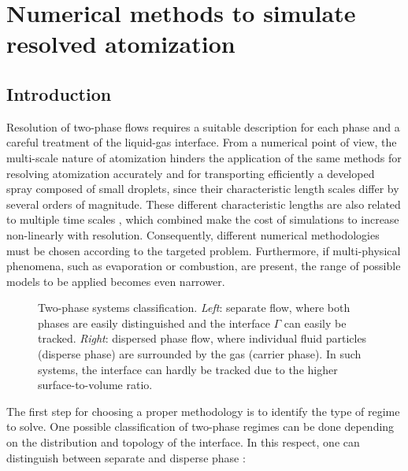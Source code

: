 \chapter{Numerical methods to simulate resolved atomization}
	\label{ch2:numerical_methods_resolved_atomization}

\section{Introduction}


Resolution of two-phase flows requires a suitable description for each phase and a careful treatment of the liquid-gas interface. From a numerical point of view, the multi-scale nature of atomization hinders the application of the same methods for resolving atomization accurately and for transporting efficiently a developed spray composed of small droplets, since their characteristic length scales differ by several orders of magnitude. These different characteristic lengths are also related to multiple time scales , which combined make the cost of simulations to increase non-linearly with resolution. Consequently, different numerical methodologies must be chosen according to the targeted problem. Furthermore, if multi-physical phenomena, such as evaporation or combustion, are present, the range of possible models to be applied becomes even narrower.

\begin{figure}[h!]	
	\centering
{}
	\caption[Two-phase systems classification]{Two-phase systems classification. \textsl{Left}: separate flow, where both phases are easily distinguished and the interface $\Gamma$ can easily be tracked. \textsl{Right}: dispersed phase flow, where individual fluid particles (disperse phase) are surrounded by the gas (carrier phase). In such systems, the interface can hardly be tracked due to the higher surface-to-volume ratio.}
	\label{fig:TPF_droplets_example}
\end{figure}

The first step for choosing a proper methodology is to identify the type of regime to solve. One possible classification of two-phase regimes can be done depending on the distribution and topology of the interface. In this respect, one can distinguish between separate and disperse phase : 



